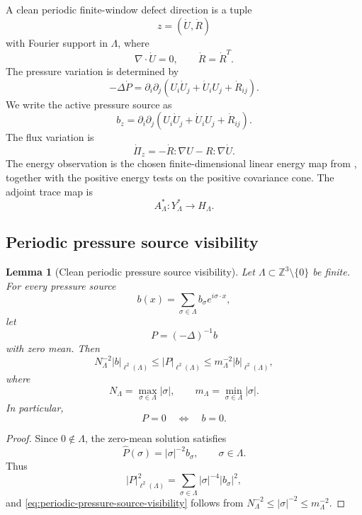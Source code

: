 \documentclass[11pt]{article}
\numberwithin{equation}{section}
\theoremstyle{plain}
\newtheorem{lemma}[theorem]{Lemma}
\theoremstyle{definition}
\theoremstyle{remark}
\newcommand{\Z}{\mathbb Z}
\begin{document}
A clean periodic finite-window defect direction is a tuple
\[
        z=(\dot U,\dot R)
\]
with Fourier support in \(\Lambda\), where
\[
        \nabla\cdot\dot U=0,
        \qquad
        \dot R=\dot R^T.
\]
The pressure variation is determined by
\begin{equation}
        -\Delta\dot P
        =
        \partial_i\partial_j
        (U_i\dot U_j+\dot U_iU_j+\dot R_{ij}).
        \label{eq:periodic-pressure-variation}
\end{equation}
We write the active pressure source as
\[
        b_z
        =
        \partial_i\partial_j
        (U_i\dot U_j+\dot U_iU_j+\dot R_{ij}).
\]
The flux variation is
\[
        \dot\Pi_z=-\dot R:\nabla U-R:\nabla\dot U.
\]
The energy observation is the chosen finite-dimensional linear energy map from
, together with the positive energy tests on the
positive covariance cone.  The adjoint trace map is
\[
        A^*_\Lambda:Y_\Lambda^*\to H_\Lambda.
\]

\subsection{Periodic pressure source visibility}

\begin{lemma}[Clean periodic pressure source visibility]
\label{lem:periodic-pressure-source-visibility}
Let \(\Lambda\subset\Z^3\setminus\{0\}\) be finite.  For every pressure source
\[
        b(x)=\sum_{\sigma\in\Lambda}b_\sigma e^{i\sigma\cdot x},
\]
let
\[
        P=(-\Delta)^{-1}b
\]
with zero mean.  Then
\begin{equation}
        N_\Lambda^{-2}|b|_{\ell^2(\Lambda)}
        \le
        |P|_{\ell^2(\Lambda)}
        \le
        m_\Lambda^{-2}|b|_{\ell^2(\Lambda)},
        \label{eq:periodic-pressure-source-visibility}
\end{equation}
where
\[
        N_\Lambda=\max_{\sigma\in\Lambda}|\sigma|,
        \qquad
        m_\Lambda=\min_{\sigma\in\Lambda}|\sigma|.
\]
In particular,
\[
        P=0\quad\Longleftrightarrow\quad b=0.
\]
\end{lemma}

\begin{proof}
Since \(0\notin\Lambda\), the zero-mean solution satisfies
\[
        \widehat P(\sigma)=|\sigma|^{-2}b_\sigma,
        \qquad \sigma\in\Lambda.
\]
Thus
\[
        |P|_{\ell^2(\Lambda)}^2
        =
        \sum_{\sigma\in\Lambda}|\sigma|^{-4}|b_\sigma|^2,
\]
and \eqref{eq:periodic-pressure-source-visibility} follows from
\(N_\Lambda^{-2}\le |\sigma|^{-2}\le m_\Lambda^{-2}\).
\end{proof}
\end{document}

